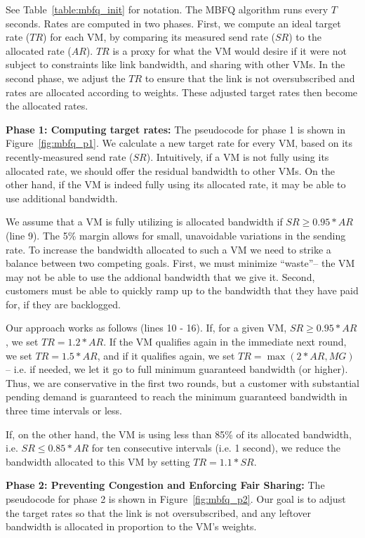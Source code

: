 See Table~\ref{table:mbfq_init} for notation.  The MBFQ algorithm runs every $T$
seconds. Rates are computed in two phases.  First, we compute an ideal target
rate ($TR$) for each VM, by comparing its measured send rate ($SR$) to the
allocated rate ($AR$). $TR$ is a proxy for what the VM would desire if it were
not subject to constraints like link bandwidth, and sharing with other VMs.  In
the second phase, we adjust the $TR$ to ensure that the link is not
oversubscribed and rates are allocated according to weights. These adjusted
target rates then become the allocated rates.

{\bf Phase 1: Computing target rates:} 
The pseudocode for phase 1 is shown in Figure~\ref{fig:mbfq_p1}. We calculate
a new target rate for every VM, based on its recently-measured send rate ($SR$).
Intuitively, if a VM is not fully using its allocated rate, we should offer the
residual bandwidth to other VMs.  On the other hand, if the VM is indeed fully
using its allocated rate, it may be able to use additional bandwidth. 

We assume that a VM is fully utilizing is allocated bandwidth if $SR \geq
0.95*AR$ (line 9). The 5\% margin allows for small, unavoidable variations in
the sending rate. To increase the bandwidth allocated to such a VM we need to
strike a balance between two competing goals. First, we must minimize
``waste''-- the VM may not be able to use the addional bandwidth that we give
it.  Second, customers must be able to quickly ramp up to the bandwidth that
they have paid for, if they are backlogged.

Our approach works as follows (lines 10 - 16).  If, for a given VM, $SR \geq
0.95*AR$, we set $TR = 1.2*AR$.  If the VM qualifies again in the immediate next
round, we set $TR = 1.5*AR$, and if it qualifies again, we set $TR = \max(2*AR,
MG)$ -- i.e.  if needed, we let it go to full minimum guaranteed bandwidth (or
higher).  Thus, we are conservative in the first two rounds, but a customer with
substantial pending demand is guaranteed to reach the minimum guaranteed
bandwidth in three time intervals or less.

If, on the other hand, the VM is using less than 85\% of its allocated
bandwidth, i.e. $SR \leq 0.85*AR$ for ten consecutive intervals (i.e. 1 second),
we reduce the bandwidth allocated to this VM by setting $TR = 1.1*SR$. 

{\bf Phase 2:  Preventing Congestion and Enforcing Fair Sharing:} The pseudocode
for phase 2 is shown in Figure~\ref{fig:mbfq_p2}. Our goal is to adjust the
target rates so that the link is not oversubscribed, and any leftover bandwidth
is allocated in proportion to the VM's weights.

